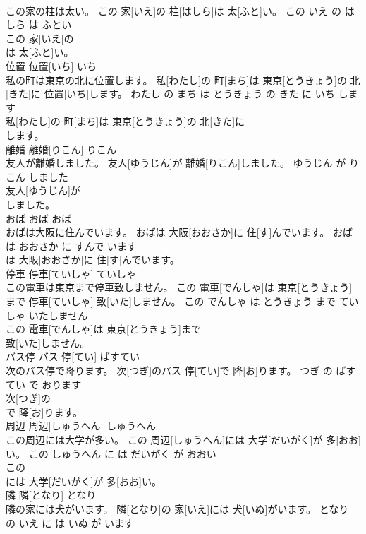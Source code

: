 \documentclass[8pt]{extreport}
\begin{document}
\begin{CJK}{UTF8}{min}
\\	この家の柱は太い。	この 家[いえ]の 柱[はしら]は 太[ふと]い。	この いえ の はしら は ふとい	
\\	この 家[いえ]の
\\	は 太[ふと]い。			
\\	位置	位置[いち]	いち	
\\	私の町は東京の北に位置します。	私[わたし]の 町[まち]は 東京[とうきょう]の 北[きた]に 位置[いち]します。	わたし の まち は とうきょう の きた に いち します	
\\	私[わたし]の 町[まち]は 東京[とうきょう]の 北[きた]に
\\	します。			
\\	離婚	離婚[りこん]	りこん	
\\	友人が離婚しました。	友人[ゆうじん]が 離婚[りこん]しました。	ゆうじん が りこん しました	
\\	友人[ゆうじん]が
\\	しました。			
\\	おば	おば	おば	
\\	おばは大阪に住んでいます。	おばは 大阪[おおさか]に 住[す]んでいます。	おば は おおさか に すんで います	
\\	は 大阪[おおさか]に 住[す]んでいます。			
\\	停車	停車[ていしゃ]	ていしゃ	
\\	この電車は東京まで停車致しません。	この 電車[でんしゃ]は 東京[とうきょう]まで 停車[ていしゃ] 致[いた]しません。	この でんしゃ は とうきょう まで ていしゃ いたしません	
\\	この 電車[でんしゃ]は 東京[とうきょう]まで
\\	致[いた]しません。			
\\	バス停	バス 停[てい]	ばすてい	
\\	次のバス停で降ります。	次[つぎ]のバス 停[てい]で 降[お]ります。	つぎ の ばすてい で おります	
\\	次[つぎ]の
\\	で 降[お]ります。			
\\	周辺	周辺[しゅうへん]	しゅうへん	
\\	この周辺には大学が多い。	この 周辺[しゅうへん]には 大学[だいがく]が 多[おお]い。	この しゅうへん に は だいがく が おおい	
\\	この
\\	には 大学[だいがく]が 多[おお]い。			
\\	隣	隣[となり]	となり	
\\	隣の家には犬がいます。	隣[となり]の 家[いえ]には 犬[いぬ]がいます。	となり の いえ に は いぬ が います	

\end{CJK}
\end{document}
